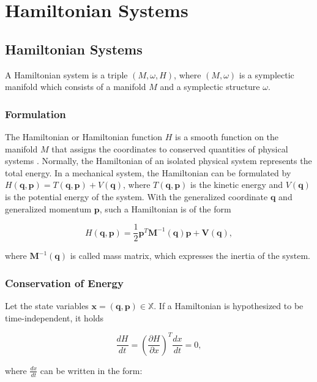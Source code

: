 \documentclass[
	parskip, 			   %
	twoside, 			   %
	DIV=14, 			   %
	BCOR=15.0mm, 		   %
	headsepline, 		   %
	open=right, 		   %
	captions=tableheading, %
	bibliography=totoc,    %
	numbers=noenddot       %
]{scrreprt}
\begin{document}
\clearpage
\chapter{Hamiltonian Systems}
\section{Hamiltonian Systems}
A Hamiltonian system is a triple $(M,\omega,H)$, where $(M,\omega)$ is a symplectic manifold which consists of a manifold $M$ and a symplectic structure $\omega$.

\subsection{Formulation}
The Hamiltonian or Hamiltonian function $H$ is a smooth function on the manifold $M$ that assigns the coordinates to conserved quantities of physical systems \cite{rudolph2017differential}. Normally, the Hamiltonian of an isolated physical system represents the total energy. In a mechanical system, the Hamiltonian can be formulated by $H(\mathbf{q},\mathbf{p})=T(\mathbf{q},\mathbf{p})+V(\mathbf{q})$, where $T(\mathbf{q},\mathbf{p})$ is the kinetic energy and $V(\mathbf{q})$ is the potential energy of the system. With the generalized coordinate $\mathbf{q}$ and generalized momentum $\mathbf{p}$, such a Hamiltonian is of the form

\begin{equation}
    \label{eq:Hamiltonian}
    H(\mathbf{q},\mathbf{p})=\frac{1}{2}\mathbf{p}^T\mathbf{M}^{-1}(\mathbf{q})\mathbf{p} + \mathbf{V}(\mathbf{q}),
\end{equation}

where $\mathbf{M}^{-1}(\mathbf{q})$ is called mass matrix, which expresses the inertia of the system.

\subsection{Conservation of Energy}
Let the state variables $\mathbf{x}=(\mathbf{q},\mathbf{p}) \in \mathbb{X}$. If a Hamiltonian is hypothesized to be time-independent, it holds

\begin{equation}
    \label{eq:Hamiltonian_invariant}
    \frac{dH}{dt} = (\frac{\partial H}{\partial x})^T \frac{dx}{dt} = 0,
\end{equation}

where $\frac{dx}{dt}$ can be written in the form:
\end{document}
